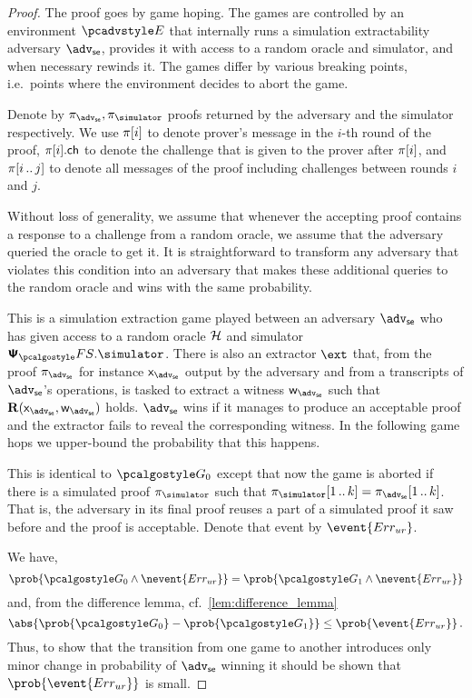 \let\accentvec\vec \documentclass[runningheads,10pt]{llncs}
\begin{document}
\begin{proof}		
	The proof goes by game hoping. The games are controlled by an environment $\env$ that internally runs a simulation extractability adversary $\advse$,  provides it with access to a random oracle and simulator, and when necessary rewinds it.
	The games differ by various breaking points, i.e.~points where the environment decides to abort the game. 

	Denote by $\zkproof_{\advse}, \zkproof_{\simulator}$ proofs
	returned by the adversary and the simulator respectively. We use $\pi[i]$
	to denote prover's message in the $i$-th round of the proof, $\pi[i].\mathsf{ch}$
	to denote the challenge that is given to the prover after $\pi[i]$, and
	$\pi[i \, .. \, j]$ to denote all messages of the proof including challenges between rounds $i$ and $j$.
	
	Without loss of generality, we assume that whenever the accepting proof contains a response to a challenge from a random oracle, we assume that the adversary queried the oracle to get it. 
	It is straightforward to transform any adversary that violates this condition into an adversary that makes these additional queries to the random oracle and wins with the same probability.
	
	This is a simulation extraction game played between an adversary $\advse$ who has given access to a random oracle $\mathcal{H}$ and simulator $\psfs.\simulator$. 
	There is also an extractor $\ext$ that, from the proof $\zkproof_\advse$ for instance $\inp_\advse$ output by the adversary and from a transcripts of $\advse$'s operations, is tasked to extract a witness $\wit_\advse$ such that $\REL(\inp_\advse, \wit_\advse)$ holds.
	$\advse$ wins if it manages to produce an acceptable proof and the extractor fails to reveal the corresponding witness.
	In the following game hops we upper-bound the probability that this happens.
	
	This is identical to $\game{0}$ except that now the game is aborted if there is a simulated proof $\zkproof_\simulator$ such that $\zkproof_\simulator\range{1}{k} = \zkproof_\advse\range{1}{k}$. That is, the adversary in its final proof reuses a part of a simulated proof it saw before and the proof is acceptable.
	Denote that event by $\event{\errur}$.
	
	We have, 
	\[
		\prob{\game{0} \land \nevent{\errur}} = \prob{\game{1} \land \nevent{\errur}}
	\]
	and, from the difference lemma, cf.~\cref{lem:difference_lemma}
	\[
		\abs{\prob{\game{0}} - \prob{\game{1}}} \leq \prob{\event{\errur}}\,.
	\]
	Thus, to show that the transition from one game to another introduces only minor change in probability of $\advse$ winning it should be shown that $\prob{\event{\errur}}$ is small.
	

\end{proof}
\end{document}
